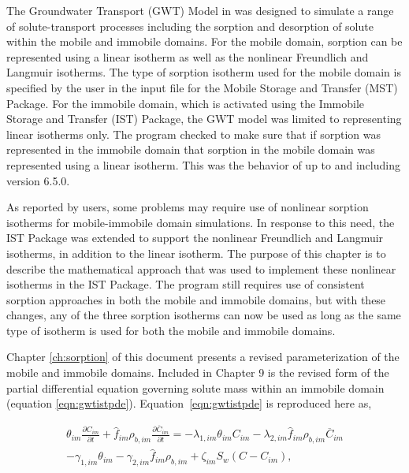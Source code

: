 The Groundwater Transport (GWT) Model \citep{modflow6gwt} in \mf was designed to simulate a range of solute-transport processes including the sorption and desorption of solute within the mobile and immobile domains.  For the mobile domain, sorption can be represented using a linear isotherm as well as the nonlinear Freundlich and Langmuir isotherms.  The type of sorption isotherm used for the mobile domain is specified by the user in the input file for the Mobile Storage and Transfer (MST) Package.  For the immobile domain, which is activated using the Immobile Storage and Transfer (IST) Package, the GWT model was limited to representing linear isotherms only.  The program checked to make sure that if sorption was represented in the immobile domain that sorption in the mobile domain was represented using a linear isotherm.  This was the behavior of \mf up to and including version 6.5.0.

As reported by \mf users, some problems may require use of nonlinear sorption isotherms for mobile-immobile domain simulations.  In response to this need, the IST Package was extended to support the nonlinear Freundlich and Langmuir isotherms, in addition to the linear isotherm.  The purpose of this chapter is to describe the mathematical approach that was used to implement these nonlinear isotherms in the IST Package. The \mf program still requires use of consistent sorption approaches in both the mobile and immobile domains, but with these changes, any of the three sorption isotherms can now be used as long as the same type of isotherm is used for both the mobile and immobile domains.

Chapter \ref{ch:sorption} of this document presents a revised parameterization of the mobile and immobile domains.  Included in Chapter 9 is the revised form of the partial differential equation governing solute mass within an immobile domain (equation \ref{eqn:gwtistpde}).  Equation~\ref{eqn:gwtistpde} is reproduced here as,

\begin{equation}
\label{eqn:gwtistpde2}
\begin{split}
\theta_{im} \frac{\partial C_{im} }{\partial t} + \hat{f}_{im} \rho_{b,im} \frac{\partial \overline{C}_{im}}{\partial t} = 
- \lambda_{1,im} \theta_{im} C_{im} - \lambda_{2,im}  \hat{f}_{im} \rho_{b,im} \overline{C}_{im} \\
- \gamma_{1,im} \theta_{im} - \gamma_{2,im} \hat{f}_{im} \rho_{b,im} 
+ \zeta_{im} S_w \left ( C - C_{im} \right ),
\end{split}
\end{equation}

